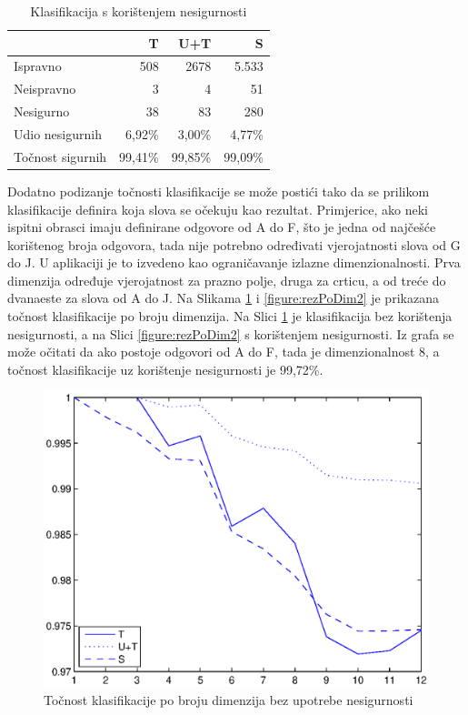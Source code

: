 \documentclass[a4paper,twocolumn,dvipdfm]{article}
\begin{document}
\begin{table}[htb]
\centering
\begin{tabular}{lrrr} \toprule
 & T & U+T & S \\ \midrule
Ispravno & 508 & 2678 & 5.533 \\
Neispravno & 3 & 4 & 51 \\
Nesigurno & 38 & 83 & 280 \\
Udio nesigurnih & 6,92\% & 3,00\% & 4,77\% \\
Točnost sigurnih & 99,41\% & 99,85\% & 99,09\% \\ \bottomrule
\end{tabular}
\caption{Klasifikacija s korištenjem nesigurnosti}
\label{table:rezultati2}
\end{table}

Dodatno podizanje točnosti klasifikacije se može postići tako da se prilikom
klasifikacije definira koja slova se očekuju kao rezultat. Primjerice, ako neki
ispitni obrasci imaju definirane odgovore od A do F, što je jedna od najčešće
korištenog broja odgovora, tada nije potrebno određivati vjerojatnosti slova od
G do J. U aplikaciji je to izvedeno kao ograničavanje izlazne dimenzionalnosti.
Prva dimenzija određuje vjerojatnost za prazno polje, druga za crticu, a od
treće do dvanaeste za slova od A do J. Na Slikama \ref{figure:rezPoDim1} i
\ref{figure:rezPoDim2} je prikazana točnost klasifikacije po broju dimenzija. Na
Slici \ref{figure:rezPoDim1} je klasifikacija bez korištenja nesigurnosti, a na
Slici \ref{figure:rezPoDim2} s korištenjem nesigurnosti. Iz grafa se može
očitati da ako postoje odgovori od A do F, tada je dimenzionalnost 8, a točnost
klasifikacije uz korištenje nesigurnosti je 99,72\%.

\begin{figure}
\centering
\includegraphics[scale=0.5]{accByDim1.eps}
\caption{Točnost klasifikacije po broju dimenzija bez upotrebe nesigurnosti}
\label{figure:rezPoDim1}
\end{figure}
\end{document}
